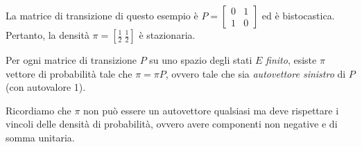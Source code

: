 \begin{ese}
	La matrice di transizione di questo esempio è $P=\left[\begin{smallmatrix}0 & 1 \\ 1 & 0\end{smallmatrix}\right]$ ed è bistocastica.
	Pertanto, la densità $\pi = [\frac 1 2 \ \frac 1 2]$ è stazionaria.
	\begin{figure}[H]
		\centering
	\end{figure}
\end{ese}
\begin{teo}\label{teo-kakuna}
	Per ogni matrice di transizione $P$ su uno spazio degli stati $E$ \emph{finito}, esiste $\pi$ vettore di probabilità tale che $\pi = \pi P$,
	ovvero tale che sia \emph{autovettore sinistro} di $P$ (con autovalore 1).
\end{teo}
Ricordiamo che $\pi$ non può essere un autovettore qualsiasi ma deve rispettare i vincoli delle densità di probabilità, ovvero avere componenti non negative e di somma unitaria.
